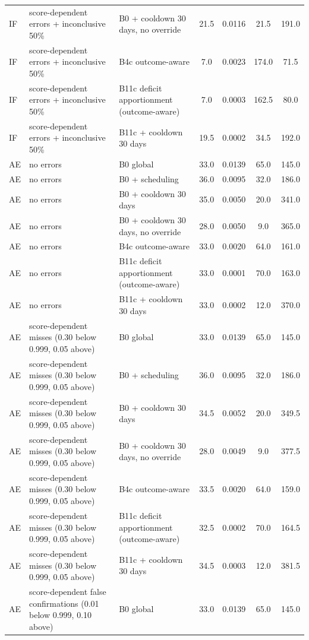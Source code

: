 \documentclass[10pt,onecolumn,letterpaper]{article}
\begin{document}
\begin{longtable}{lp{5.2cm}p{4.4cm}cccc}
IF & score-dependent errors + inconclusive 50\% & B0 + cooldown 30 days, no override & 21.5 & 0.0116 & 21.5 & 191.0 \\
IF & score-dependent errors + inconclusive 50\% & B4c outcome-aware & 7.0 & 0.0023 & 174.0 & 71.5 \\
IF & score-dependent errors + inconclusive 50\% & B11c deficit apportionment (outcome-aware) & 7.0 & 0.0003 & 162.5 & 80.0 \\
IF & score-dependent errors + inconclusive 50\% & B11c + cooldown 30 days & 19.5 & 0.0002 & 34.5 & 192.0 \\
AE & no errors & B0 global & 33.0 & 0.0139 & 65.0 & 145.0 \\
AE & no errors & B0 + scheduling & 36.0 & 0.0095 & 32.0 & 186.0 \\
AE & no errors & B0 + cooldown 30 days & 35.0 & 0.0050 & 20.0 & 341.0 \\
AE & no errors & B0 + cooldown 30 days, no override & 28.0 & 0.0050 & 9.0 & 365.0 \\
AE & no errors & B4c outcome-aware & 33.0 & 0.0020 & 64.0 & 161.0 \\
AE & no errors & B11c deficit apportionment (outcome-aware) & 33.0 & 0.0001 & 70.0 & 163.0 \\
AE & no errors & B11c + cooldown 30 days & 33.0 & 0.0002 & 12.0 & 370.0 \\
AE & score-dependent misses (0.30 below 0.999, 0.05 above) & B0 global & 33.0 & 0.0139 & 65.0 & 145.0 \\
AE & score-dependent misses (0.30 below 0.999, 0.05 above) & B0 + scheduling & 36.0 & 0.0095 & 32.0 & 186.0 \\
AE & score-dependent misses (0.30 below 0.999, 0.05 above) & B0 + cooldown 30 days & 34.5 & 0.0052 & 20.0 & 349.5 \\
AE & score-dependent misses (0.30 below 0.999, 0.05 above) & B0 + cooldown 30 days, no override & 28.0 & 0.0049 & 9.0 & 377.5 \\
AE & score-dependent misses (0.30 below 0.999, 0.05 above) & B4c outcome-aware & 33.5 & 0.0020 & 64.0 & 159.0 \\
AE & score-dependent misses (0.30 below 0.999, 0.05 above) & B11c deficit apportionment (outcome-aware) & 32.5 & 0.0002 & 70.0 & 164.5 \\
AE & score-dependent misses (0.30 below 0.999, 0.05 above) & B11c + cooldown 30 days & 34.5 & 0.0003 & 12.0 & 381.5 \\
AE & score-dependent false confirmations (0.01 below 0.999, 0.10 above) & B0 global & 33.0 & 0.0139 & 65.0 & 145.0 \\

\end{longtable}
\end{document}
